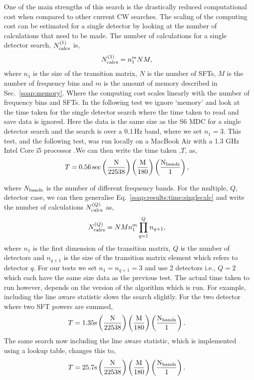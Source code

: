 One of the main strengths of this search is the drastically reduced computational cost when compared to other current \gls{CW} searches.
The scaling of the computing cost can be estimated for a single detector by looking at the number of calculations that need to be made. 
The number of calculations for a single detector search, $N^{(1)}_{\rm{calcs}}$ is,
\begin{equation}
\label{soap:results:time:singlecalc}
N^{(1)}_{\rm{calcs}} = n_{1}^{m}NM,
\end{equation}
where $n_1$ is the size of the transition matrix, $N$ is the number of \glspl{SFT}, $M$ is the number of frequency bins and $m$ is the amount of memory described in Sec.~\ref{soap:memory}. Where the computing cost scales linearly with the number of frequency bins and \glspl{SFT}.
In the following test we ignore `memory' and look at the time taken for the single detector search where the time taken to read and save data is ignored. Here the data is the same size as the S6 \gls{MDC} for a single detector search and the search is over a 0.1\,Hz band, where we set $n_1=3$. This test, and the following test, was run locally on a MacBook Air with a 1.3 GHz Intel Core i5 processor .We can then write the time taken ,$T$, as,
%
\begin{equation}
T = 0.56\,\rm{sec}\left( \frac{N}{22538}\right) \left( \frac{M}{180}\right) \left( \frac{N_{\rm{bands}}}{1}\right),
\end{equation}

where  $N_{\rm{bands}}$ is the number of different frequency
bands.
For the multiple, $Q$, detector case, we can then generalise Eq.~\ref{soap:results:time:singlecalc} and write the number of calculations $N^{(Q)}_{\rm{calcs}}$ as,
\begin{equation}
\label{soap:results:time:numbercalcs}
N^{(Q)}_{\rm{calcs}} = NMn_{1}^{m} \prod_{q=1}^{Q}n_{q+1},
\end{equation}
where $n_1$ is the first dimension of the transition matrix, $Q$ is the number of detectors and $n_{q+1}$ is the size of the transition matrix element which refers to detector $q$.
For our tests we set $n_1=n_{q+1}=3$ and use 2 detectors i.e., $Q=2$ which each have the same size data as the previous test. The actual time taken to run however, depends on the version of the algorithm which is run. For example, including the line aware statistic slows the search slightly.
For the two detector where two \gls{SFT} powers are summed,
\begin{equation}
T = 1.35 \rm{s}\left( \frac{N}{22538}\right) \left( \frac{M}{180}\right) \left( \frac{N_{\rm{bands}}}{1}\right).
\end{equation}
The same search now including the line aware statistic, which is implemented using a lookup table, changes this to,
\begin{equation}
T = 25.7 \rm{s}\left( \frac{N}{22538}\right) \left( \frac{M}{180}\right) \left( \frac{N_{\rm{bands}}}{1}\right).
\end{equation}

